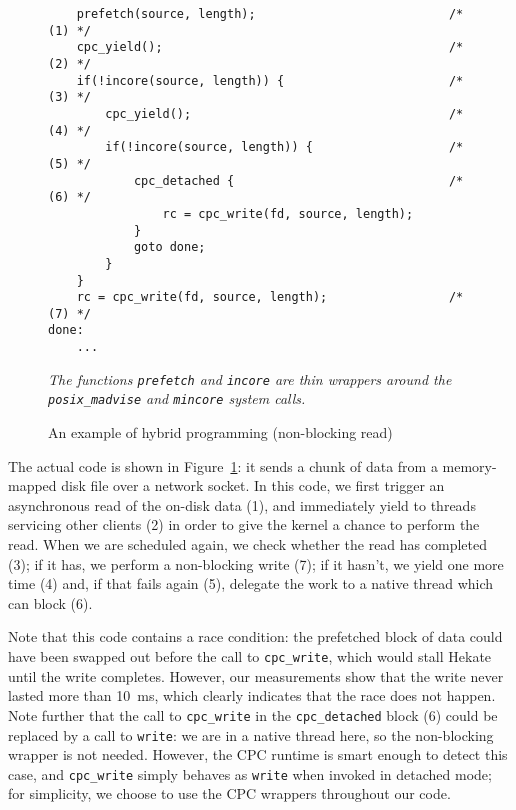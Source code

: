 \documentclass{easychair}
\begin{document}
\begin{figure}
\begin{center}
\begin{minipage}{0.8\linewidth}
\small
\begin{verbatim}
    prefetch(source, length);                           /* (1) */
    cpc_yield();                                        /* (2) */
    if(!incore(source, length)) {                       /* (3) */
        cpc_yield();                                    /* (4) */
        if(!incore(source, length)) {                   /* (5) */
            cpc_detached {                              /* (6) */
                rc = cpc_write(fd, source, length);
            }
            goto done;
        }
    }
    rc = cpc_write(fd, source, length);                 /* (7) */
done:
    ...
\end{verbatim}
\end{minipage}
\end{center}
{\small\em The functions \verb|prefetch| and \verb|incore| are thin
wrappers around the {\tt posix\_madvise} and {\tt mincore} system
calls.}
\caption{An example of hybrid programming (non-blocking read)}
\label{fig:non-blocking-read}
\end{figure}

The actual code is shown in Figure~\ref{fig:non-blocking-read}: it sends
a chunk of data from a memory-mapped disk file over a network socket.
In this code, we first trigger an asynchronous read of the on-disk data
(1), and immediately yield to threads servicing other clients (2) in
order to give the kernel a chance to perform the read.  When we are
scheduled again, we check whether the read has completed (3); if it has,
we perform a non-blocking write (7); if it hasn't, we yield one more
time (4) and, if that fails again (5), delegate the work to a native
thread which can block (6).

Note that this code contains a race condition: the prefetched block of
data could have been swapped out before the call to {\tt cpc\_write},
which would stall Hekate until the write completes.  However, our
measurements show that the write never lasted more than 10~ms, which
clearly indicates that the race does not happen.  Note further
that the call to {\tt cpc\_write} in the {\tt cpc\_detached} block (6)
could be replaced by a call to {\tt write}: we are in a native thread
here, so the non-blocking wrapper is not needed.  However, the CPC
runtime is smart enough to detect this case, and {\tt cpc\_write} simply
behaves as {\tt write} when invoked in detached mode; for simplicity, we
choose to use the CPC wrappers throughout our code.
\end{document}
